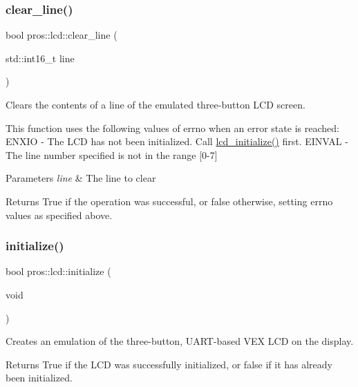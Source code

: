 \subsubsection{\texorpdfstring{clear\+\_\+line()}{clear\_line()}}
{\footnotesize\ttfamily bool pros\+::lcd\+::clear\+\_\+line (\begin{DoxyParamCaption}\item[{std\+::int16\+\_\+t}]{line }\end{DoxyParamCaption})}

Clears the contents of a line of the emulated three-\/button L\+CD screen.

This function uses the following values of errno when an error state is reached\+: E\+N\+X\+IO -\/ The L\+CD has not been initialized. Call \hyperlink{llemu_8h_ae618494f080e95b506c0c18cb1ffb407}{lcd\+\_\+initialize()} first. E\+I\+N\+V\+AL -\/ The line number specified is not in the range \mbox{[}0-\/7\mbox{]}


\begin{DoxyParams}{Parameters}
{\em line} & The line to clear\\
\hline
\end{DoxyParams}
\begin{DoxyReturn}{Returns}
True if the operation was successful, or false otherwise, setting errno values as specified above. 
\end{DoxyReturn}
\mbox{\label{namespacepros_1_1lcd_afb69bfa2fc5da3018b6886f612ed190e}} 
\subsubsection{\texorpdfstring{initialize()}{initialize()}}
{\footnotesize\ttfamily bool pros\+::lcd\+::initialize (\begin{DoxyParamCaption}\item[{void}]{ }\end{DoxyParamCaption})}

Creates an emulation of the three-\/button, U\+A\+R\+T-\/based V\+EX L\+CD on the display.

\begin{DoxyReturn}{Returns}
True if the L\+CD was successfully initialized, or false if it has already been initialized. 
\end{DoxyReturn}
\mbox{\label{namespacepros_1_1lcd_a867eb9cd989e1c6c31982fe2b5c58dd9}} 
